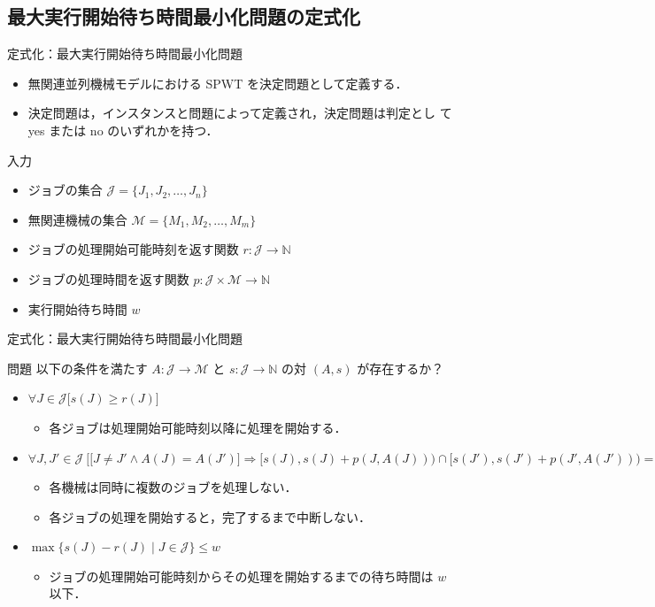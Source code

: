 \documentclass[dvipdfmx]{beamer}
\begin{document}
\subsection{最大実行開始待ち時間最小化問題の定式化}
\begin{frame}{定式化：最大実行開始待ち時間最小化問題}
  \begin{itemize}
    \item {無関連並列機械モデルにおける SPWT を決定問題として定義する．}
    \item {決定問題は，インスタンスと問題によって定義され，決定問題は判定とし
    て yes または no のいずれかを持つ．}
  \end{itemize}
  \begin{block}{入力}
    \begin{itemize}
      \item {ジョブの集合 $\mathcal{J} = \{J_1,J_2,\ldots,J_n\}$}
      \item {無関連機械の集合 $\mathcal{M} = \{M_1,M_2,\ldots,M_m\}$}
      \item {ジョブの処理開始可能時刻を返す関数 $r : \mathcal{J} \to \mathbb{N}$}
      \item {ジョブの処理時間を返す関数 $p : \mathcal{J} \times \mathcal{M} \to \mathbb{N}$}
      \item {実行開始待ち時間 $w$}
    \end{itemize}
  \end{block}
\end{frame}

\begin{frame}{定式化：最大実行開始待ち時間最小化問題}
  \begin{block}{問題}
    以下の条件を満たす $A : \mathcal{J} \to \mathcal{M}$ と $s : \mathcal{J} \to \mathbb{N}$ の対 $(A,s)$ が存在するか？
    \begin{itemize}
      \item {$\forall J \in \mathcal{J}\big[s(J) \ge r(J) \big]$}
      \begin{itemize}
        \item {各ジョブは処理開始可能時刻以降に処理を開始する．}
      \end{itemize}
      \item {$\forall J, J' \in \mathcal{J}\ \Big[ \big[J\ne J' \land A(J) = A(J')\big] \Rightarrow [s(J), s(J)+p(J,A(J))) \cap[s(J'), s(J')+p(J', A(J'))) = \emptyset \Big]$}
      \begin{itemize}
        \item {各機械は同時に複数のジョブを処理しない．}
        \item {各ジョブの処理を開始すると，完了するまで中断しない．}
      \end{itemize}
      \item {$\max\big\{s(J) - r(J) \mid J \in \mathcal{J}\big\} \le w$}
      \begin{itemize}
        \item {ジョブの処理開始可能時刻からその処理を開始するまでの待ち時間は $w$ 以下．}
      \end{itemize}
    \end{itemize}
  \end{block}
\end{frame}
\end{document}
